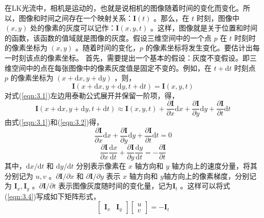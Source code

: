 在LK光流中，相机是运动的，也就是说相机的图像随着时间的变化而变化。所以，图像和时间之间存在一个映射关系：$\bm{I}(t) $ 。那么，在 $t$ 时刻，图像中 $(x,y)$ 处的像素的灰度可以记作：$ \boldsymbol{I}(x, y, t) $ 。这样，图像就是关于位置和时间的函数，该函数的值域就是图像的灰度。假设三维空间中的一个点 $p$ 在 $t$  时刻时的像素坐标为 $(x,y)$ 。随着时间的变化，$p$ 的像素坐标将发生变化。要估计出每一时刻该点的像素坐标。
首先，需要提出一个基本的假设：灰度不变假设。即三维空间中的点在每张图像中的像素灰度值是固定不变的。例如，在 $t+\mathrm{d} t $ 时刻点  $p$ 的像素坐标为 $(x+\mathrm{d} x, y+\mathrm{d} y) $ ，则，
\begin{equation}
\label{eqn:3.1}
\boldsymbol{I}(x+\mathrm{d} x, y+\mathrm{d} y, t+\mathrm{d} t)=\boldsymbol{I}(x, y, t)
\end{equation}
对式(\ref{eqn:3.1})左边用泰勒公式展开并保留一阶项，得，
\begin{equation}
\label{eqn:3.2}
\boldsymbol{I}(x+\mathrm{d} x, y+\mathrm{d} y, t+\mathrm{d} t) \approx \boldsymbol{I}(x, y, t)+\frac{\partial \boldsymbol{I}}{\partial x} \mathrm{d} x+\frac{\partial \boldsymbol{I}}{\partial y} \mathrm{d} y+\frac{\partial \boldsymbol{I}}{\partial t} \mathrm{d} t
\end{equation}
由式(\ref{eqn:3.1})和(\ref{eqn:3.2})得，
\begin{equation}
\label{eqn:3.3}
\frac{\partial \boldsymbol{I}}{\partial x} \mathrm{d} x+\frac{\partial \boldsymbol{I}}{\partial y} \mathrm{d} y+\frac{\partial \boldsymbol{I}}{\partial t} \mathrm{d} t=0
\end{equation}
\begin{equation}
\label{eqn:3.4}
\frac{\partial \boldsymbol{I}}{\partial x} \frac{\mathrm{d} x}{\mathrm{d} t}+\frac{\partial \boldsymbol{I}}{\partial y} \frac{\mathrm{d} y}{\mathrm{d} t}=-\frac{\partial \boldsymbol{I}}{\partial t}
\end{equation}
其中，$\mathrm{d} x / \mathrm{d} t $ 和 $\mathrm{d} y / \mathrm{d} t $ 分别表示像素在 $x$ 轴方向和 $y$ 轴方向上的速度分量，将其分别记为 $u, v $ 。$\partial \boldsymbol{I} / \partial x $ 和 $\partial \boldsymbol{I} / \partial y $ 表示 $x$ 轴方向和 $y$轴方向上的像素梯度，分别记为 $\boldsymbol{I}_{x}, \boldsymbol{I}_{y} $ 。$\partial \boldsymbol{I} / \partial t $ 表示图像灰度随时间的变化量，记为$\boldsymbol{I}_{t} $ 。这样可以将式(\ref{eqn:3.4})写成如下矩阵形式，
\begin{equation}
\label{eqn:3.5}
\left[ \begin{array}{ll}{\boldsymbol{I}_{x}} & {\boldsymbol{I}_{y}}\end{array}\right] \left[ \begin{array}{l}{u} \\ {v}\end{array}\right]=-\boldsymbol{I}_{t}
\end{equation}

